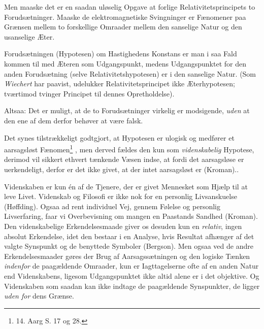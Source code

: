 \documentclass[12pt,a4paper]{article}
\newcommand{\opage}[1]{\marginnote{\footnotesize\textit{[#1]}}}
\begin{document}
Men maaske det er en saadan uløselig Opgave at forlige
Relativitetsprincipets to Forudsætninger. Maaske de elektromagnetiske
Svingninger er Fænomener paa Grænsen mellem to forskellige Omraader
mellem den sanselige Natur og den usanselige Æter.

Forudsætningen (Hypotesen) om Hastighedens Konstans er man i saa Fald
kommen til med Æteren som Udgangspunkt, medens Udgangspunktet for den
anden Forudsætning (selve Relativitetshypotesen) er i den sanselige
Natur. (Som \emph{Wiechert} har paavist, udelukker Relativitetsprincipet
ikke Æterhypotesen; tværtimod tvinger Principet til dennes
Opretholdelse).

Altsaa: Det er muligt, at de to Forudsætninger virkelig er modsigende,
\emph{uden} at den ene af dem derfor behøver at være falsk.

\bigskip

Det synes tilstrækkeligt godtgjort, at Hypotesen er ulogisk og medfører
et \guillemotright aarsagsløst Fænomen\guillemotleft\footnote{14. Aarg
S. 17 og 28.}%
, men derved fældes den kun som \emph{videnskabelig} Hypotese,
\guillemotright derimod vil sikkert ethvert
\opage{16} \guillemotright tænkende Væsen\guillemotleft{} indse, at fordi det
aarsagsløse er uerkendeligt, derfor er det ikke givet, at der intet
aarsagsløst er\guillemotleft{} (Kroman)..%

Videnskaben er kun én af de Tjenere, der er givet Mennesket som Hjælp til
at leve Livet. \guillemotright Videnskab og Filosofi er ikke nok for en
personlig Livsanskuelse\guillemotleft{} (Høffding). \guillemotright Ogsaa
ad rent individuel Vej, gennem Følelse og personlig Livserfaring, faar vi
Overbevisning om mangen en Paastands Sandhed\guillemotleft{} (Kroman).
Den videnskabelige Erkendelsesmaade giver os desuden kun en
\emph{relativ}, ingen absolut Erkendelse, idet den bestaar i en Analyse,
hvis Resultat afhænger af det valgte Synspunkt og de benyttede Symboler
(Bergson). Men ogsaa ved de andre Erkendelsesmaader gøres der Brug af
Aarsagssætningen og den logiske Tænken \emph{indenfor} de paagældende
Omraader, kun er Iagttagelserne ofte af en anden Natur end Videnskabens,
ligesom Udgangspunktet ikke altid alene er i det objektive. Og
Videnskaben som saadan kan ikke indtage de paagældende Synspunkter, de
ligger \emph{uden for} dens Grænse.
\end{document}
